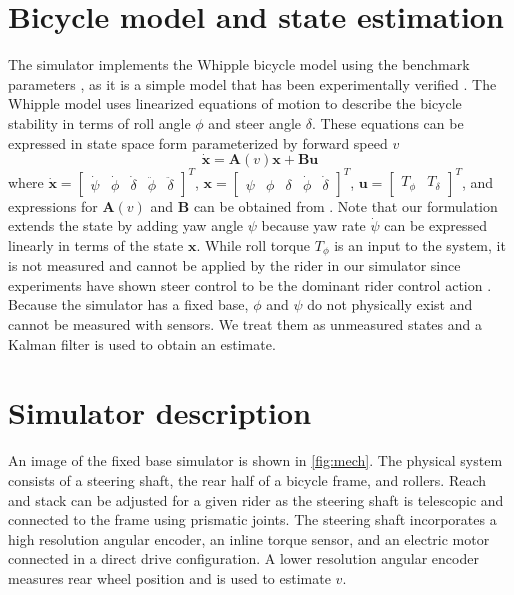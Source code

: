 \documentclass{icsc2017a}
\newcommand{\dstate}{\dot{\bm{x}}}
\newcommand{\state}{\bm{x}}
\newcommand{\sysInput}{\bm{u}}
\newcommand{\stateMat}{\bm{A}}
\newcommand{\inputMat}{\bm{B}}
\newcommand{\yaw}{\psi}
\newcommand{\roll}{\phi}
\newcommand{\steer}{\delta}
\newcommand{\yawRate}{\dot{\psi}}
\newcommand{\rollRate}{\dot{\phi}}
\newcommand{\steerRate}{\dot{\delta}}
\newcommand{\rollAccel}{\ddot{\phi}}
\newcommand{\steerAccel}{\ddot{\delta}}
\begin{document}
\section{Bicycle model and state estimation}
\label{sec:model_and_estimator}
The simulator implements the Whipple bicycle model using the benchmark parameters \cite{meijaard2007linearized}, as it is
a simple model that has been experimentally verified \cite{kooijman2008experimental}.
The Whipple model uses linearized equations of motion to describe the bicycle stability in terms of roll angle $\roll$ and
steer angle $\steer$.
These equations can be expressed in state space form parameterized by forward speed $v$
\begin{equation}
    \dstate = \stateMat{(v)} \state + \inputMat \sysInput \label{eq:state_space}
\end{equation}
where $ \dstate = \begin{bmatrix} \yawRate & \rollRate & \steerRate & \rollAccel & \steerAccel \end{bmatrix}^T $,
$ \state = \begin{bmatrix} \yaw & \roll & \steer& \rollRate & \steerRate \end{bmatrix}^T $,
$ \sysInput = \begin{bmatrix} T_\roll & T_\steer  \end{bmatrix}^T $, and expressions for $ \stateMat(v) $ and
$ \inputMat $ can be obtained from \cite{meijaard2007linearized}.
Note that our formulation extends the state by adding yaw angle $ \yaw $ because yaw rate $ \yawRate $ can be expressed linearly in terms of the state $\state$.
While roll torque $ T_\roll $ is an input to the system, it is not measured and cannot be applied by the
rider in our simulator since experiments have shown steer control to be the dominant rider control
action \cite{moore2011rider}.
Because the simulator has a fixed base, $\roll$ and $\yaw$ do not physically exist and cannot be measured
with sensors.
We treat them as unmeasured states and a Kalman filter is used to obtain an estimate.

\section{Simulator description}
An image of the fixed base simulator is shown in \autoref{fig:mech}. The physical system consists of a steering shaft,
the rear half of a bicycle frame, and rollers.
Reach and stack can be adjusted for a given rider as the steering shaft is telescopic and connected to the frame using
prismatic joints.
The steering shaft incorporates a high resolution angular encoder, an inline torque sensor, and an
electric motor connected in a direct drive configuration.
A lower resolution angular encoder measures rear wheel position and is used to estimate $v$.
\end{document}

